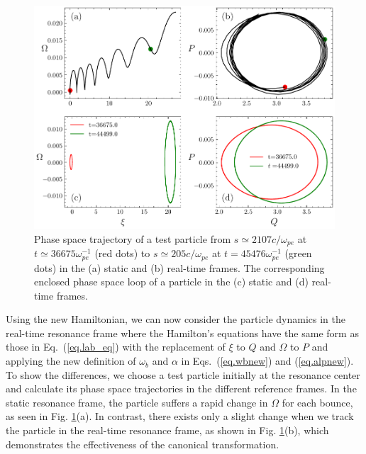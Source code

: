 \begin{figure}
    \centering
    \includegraphics[scale=0.5]{img/Trajectory.pdf}
    \caption{Phase space trajectory of a test particle from $s \simeq 2107 c/\omega_{pe}$ at $t\simeq 36675 \omega_{pe}^{-1}$ 
    (red dots)
     to $s \simeq 205 c/\omega_{pe}$ at $t=45476 \omega_{pe}^{-1}$ 
    (green dots)
      in the (a) static  and  (b) real-time frames.  The corresponding enclosed phase space loop of a particle in the (c)  static and  (d) real-time  frames. 
    \label{fig.traj} 
    }
\end{figure}

 Using the new Hamiltonian, we can now consider  the particle dynamics in the real-time resonance frame
 where the Hamilton's equations have the same form as those in Eq.~(\ref{eq.lab_eq}) with the replacement of $\xi$ to $Q$ and $\Omega$ to $P$ and applying the new definition of ${\omega_{b}}$ and $\alpha$  in Eqs.~(\ref{eq.wbnew}) and (\ref{eq.alpnew}).
To show the differences, we choose a test particle initially at the resonance center and calculate its phase space trajectories in the different reference frames. In the static resonance frame, the particle suffers a rapid change in $\Omega$  for each bounce, as seen   in Fig. \ref{fig.traj}(a). In contrast, there exists only a slight change when we track the particle in the real-time resonance frame, as shown in Fig. \ref{fig.traj}(b), which demonstrates the effectiveness of the canonical transformation.


